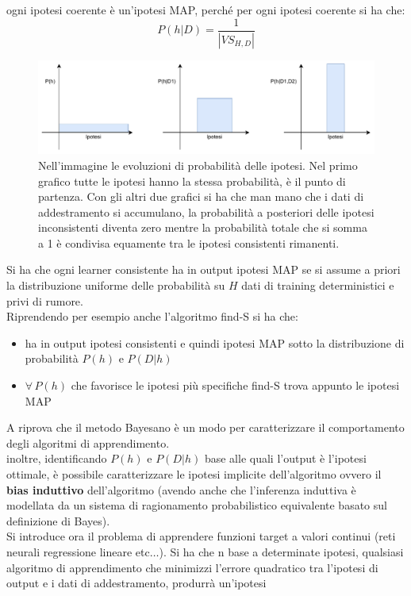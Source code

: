 ogni ipotesi coerente è un'ipotesi MAP, perché per ogni ipotesi coerente si ha
che:
\[P(h|D)=\frac{1}{|VS_{H, D}|}\]
\begin{figure}
  \centering
  \includegraphics[scale = 0.6]{img/map.pdf}
  \caption{Nell'immagine le evoluzioni di probabilità delle
    ipotesi. Nel primo grafico tutte le ipotesi hanno la stessa probabilità, è
    il punto di partenza. Con gli altri due grafici si ha che man mano che i
    dati di addestramento si accumulano, la probabilità a posteriori delle
    ipotesi inconsistenti diventa zero mentre la probabilità totale che si somma
    a 1 è condivisa equamente tra le ipotesi consistenti rimanenti.}
\end{figure}
Si ha che ogni learner consistente ha in output ipotesi MAP se si assume a
priori la distribuzione uniforme delle probabilità su $H$ dati di training
deterministici e privi di rumore.\\
Riprendendo per esempio anche l'algoritmo find-S si ha che:
\begin{itemize}
  \item ha in output ipotesi consistenti e quindi ipotesi MAP sotto la
  distribuzione di probabilità $P(h)$ e $P(D|h)$
  \item $\forall\, P(h)$ che favorisce le ipotesi più specifiche find-S trova
  appunto le ipotesi MAP
\end{itemize}
A riprova che il metodo Bayesano è un modo per caratterizzare il comportamento
degli algoritmi di apprendimento.\\
inoltre, identificando $P(h)$ e $P(D|h)$ base alle quali l'output è l'ipotesi
ottimale, è possibile caratterizzare le ipotesi implicite dell'algoritmo ovvero
il \textbf{bias induttivo} dell'algoritmo (avendo anche che l'inferenza
induttiva è modellata da un sistema di ragionamento probabilistico equivalente
basato sul definizione di Bayes). \\
Si introduce ora il problema di apprendere funzioni target a valori continui
(reti neurali regressione lineare etc$\ldots$). Si ha che n base a determinate
ipotesi, qualsiasi algoritmo di apprendimento che minimizzi l'errore quadratico
tra l'ipotesi di output e i dati di addestramento, produrrà un'ipotesi
